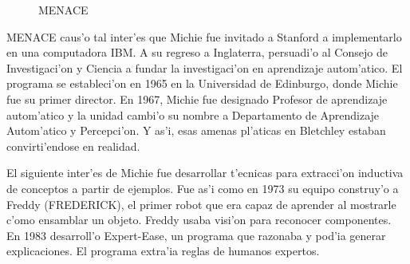 \documentclass[11pt]{article}
\begin{document}
\begin{figure}[h]

\centering
{}
\caption[MENACE]{MENACE} 
\label{fig:menace}

\end{figure}


MENACE caus'o tal inter'es que Michie fue invitado a Stanford a implementarlo en una computadora IBM. A su regreso a Inglaterra, persuadi'o al Consejo de Investigaci'on y Ciencia a fundar la investigaci'on en aprendizaje autom'atico. El programa se estableci'on en 1965 en la Universidad de Edinburgo, donde Michie fue su primer director. En 1967, Michie fue designado Profesor de aprendizaje autom'atico y la unidad cambi'o su nombre a Departamento de Aprendizaje Autom'atico y Percepci'on. Y as'i, esas amenas pl'aticas en Bletchley estaban convirti'endose en realidad.





El siguiente inter'es de Michie fue desarrollar t'ecnicas para extracci'on inductiva de conceptos a partir de ejemplos. Fue as'i como en 1973 su equipo construy'o a Freddy (FREDERICK), el primer robot que era capaz de aprender al mostrarle c'omo ensamblar un objeto. Freddy usaba visi'on para reconocer componentes. En 1983 desarroll'o Expert-Ease, un programa que razonaba y pod'ia generar explicaciones. El programa extra'ia reglas de humanos expertos.
\end{document}
